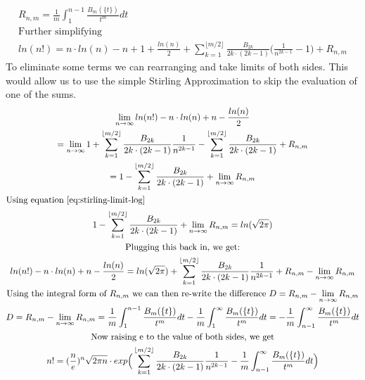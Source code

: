 \documentclass[a4paper]{article}
\begin{document}
\begin{theorem}
\begin{gather*}
            \\
            R_{n,m} = \frac{1}{m} \int_{1}^{n-1} \frac{B_m(\{t\})}{t^m}  dt
            \\
            \text{Further simplifying}
            \\
            ln(n!) = n \cdot ln(n) - n + 1 +
            \frac{ln(n)}{2}
            + \sum_{k=1}^{\lfloor m/2 \rfloor} \frac{B_{2k}}{2k \cdot (2k-1)} \Big(\frac{1}{n^{2k-1}} - 1\Big) + R_{n,m}
        \end{gather*}
        To eliminate some terms we can rearranging and take limits of both sides.
        This would allow us to use the simple Stirling Approximation to skip the evaluation of one of the sums.
        \begin{gather*}
            \lim_{n \to \infty}
            ln(n!)  - n \cdot ln(n) + n - \frac{ln(n)}{2}
            \\
            = \lim_{n \to \infty}
            1 + \sum_{k=1}^{\lfloor m/2 \rfloor} \frac{B_{2k}}{2k \cdot (2k-1)} \frac{1}{n^{2k-1}}
            - \sum_{k=1}^{\lfloor m/2 \rfloor} \frac{B_{2k}}{2k \cdot (2k-1)}
            + R_{n,m}
            \\
            = 1 - \sum_{k=1}^{\lfloor m/2 \rfloor} \frac{B_{2k}}{2k \cdot (2k-1)}
            + \lim_{n \to \infty} R_{n,m}
            \\
            \intertext{Using equation~\ref{eq:stirling-limit-log}}
            1 - \sum_{k=1}^{\lfloor m/2 \rfloor} \frac{B_{2k}}{2k \cdot (2k-1)} + \lim_{n \to \infty} R_{n,m}
            = ln(\sqrt{2\pi})
            \\
            \text{Plugging this back in, we get:}
            \\
            ln(n!)  - n \cdot ln(n) + n - \frac{ln(n)}{2}
            = ln(\sqrt{2\pi}) + \sum_{k=1}^{\lfloor m/2 \rfloor} \frac{B_{2k}}{2k \cdot (2k-1)} \frac{1}{n^{2k-1}}
            + R_{n,m} - \lim_{n \to \infty} R_{n,m}
            \\
            \text{Using the integral form of $R_{n,m}$ we can then re-write the difference }
            D = R_{n,m} - \lim_{n \to \infty} R_{n,m}
            \\
            D = R_{n,m} - \lim_{n \to \infty} R_{n,m}
            =
            \frac{1}{m} \int_{1}^{n-1} \frac{B_m(\{t\})}{t^m}  dt
            -
            \frac{1}{m} \int_{1}^{\infty} \frac{B_m(\{t\})}{t^m}  dt
            =
            - \frac{1}{m} \int_{n-1}^{\infty} \frac{B_m(\{t\})}{t^m}  dt
            \\
            \text{Now raising e to the value of both sides, we get}
            \\
            n! = (\frac{n}{e})^n \sqrt{2\pi n} \cdot
            exp \Big( \sum_{k=1}^{\lfloor m/2 \rfloor} \frac{B_{2k}}{2k \cdot (2k-1)} \frac{1}{n^{2k-1}} - \frac{1}{m} \int_{n-1}^{\infty} \frac{B_m(\{t\})}{t^m}  dt \Big)
        \end{gather*}
    \end{theorem}
\end{document}
